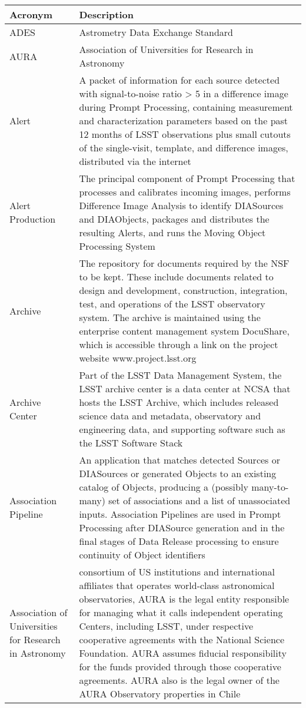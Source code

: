 \addtocounter{table}{-1}
\begin{longtable}{|p{}|p{}|}\hline
\textbf{Acronym} & \textbf{Description}  \\\hline

ADES & Astrometry Data Exchange Standard \\\hline
AURA & \gls{Association of Universities for Research in Astronomy} \\\hline
Alert & A packet of information for each source detected with signal-to-noise ratio > 5 in a difference image during \gls{Prompt Processing}, containing measurement and characterization parameters based on the past 12 months of \gls{LSST} observations plus small cutouts of the single-visit, template, and difference images, distributed via the internet \\\hline
Alert Production & The principal component of \gls{Prompt Processing} that processes and calibrates incoming images, performs \gls{Difference Image Analysis} to identify DIASources and DIAObjects, packages and distributes the resulting Alerts, and runs the \gls{Moving Object Processing System} \\\hline
Archive & The repository for documents required by the \gls{NSF} to be kept. These include documents related to design and development, construction, integration, test, and operations of the \gls{LSST} observatory system. The archive is maintained using the enterprise content management system \gls{DocuShare}, which is accessible through a link on the project website www.project.lsst.org \\\hline
Archive \gls{Center} & Part of the \gls{LSST} \gls{Data Management System}, the \gls{LSST} archive center is a data center at \gls{NCSA} that hosts the \gls{LSST} \gls{Archive}, which includes released science data and \gls{metadata}, observatory and engineering data, and supporting software such as the \gls{LSST} \gls{Software Stack} \\\hline
Association Pipeline & An application that matches detected Sources or DIASources or generated Objects to an existing catalog of Objects, producing a (possibly many-to-many) set of associations and a list of unassociated inputs. Association Pipelines are used in \gls{Prompt Processing} after \gls{DIASource} generation and in the final stages of \gls{Data Release} processing to ensure continuity of \gls{Object} identifiers \\\hline
Association of Universities for Research in Astronomy &  consortium of \gls{US} institutions and international affiliates that operates world-class astronomical observatories, \gls{AURA} is the legal entity responsible for managing what it calls independent operating Centers, including \gls{LSST}, under respective cooperative agreements with the \gls{National Science Foundation}. \gls{AURA} assumes fiducial responsibility for the funds provided through those cooperative agreements. \gls{AURA} also is the legal owner of the \gls{AURA} Observatory properties in Chile \\\hline

\end{longtable}
